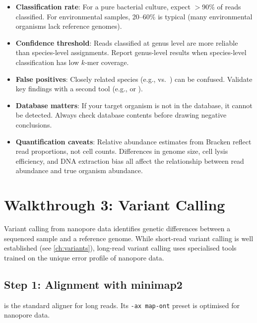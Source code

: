 \begin{itemize}[nosep]
  \item \textbf{Classification rate}: For a pure bacterial culture, expect $>$90\% of reads classified. For environmental samples, 20--60\% is typical (many environmental organisms lack reference genomes).
  \item \textbf{Confidence threshold}: Reads classified at genus level are more reliable than species-level assignments. Report genus-level results when species-level classification has low $k$-mer coverage.
  \item \textbf{False positives}: Closely related species (e.g.,  vs.\ ) can be confused. Validate key findings with a second tool (e.g.,  or ).
  \item \textbf{Database matters}: If your target organism is not in the database, it cannot be detected. Always check database contents before drawing negative conclusions.
  \item \textbf{Quantification caveats}: Relative abundance estimates from Bracken reflect read proportions, not cell counts. Differences in genome size, cell lysis efficiency, and DNA extraction bias all affect the relationship between read abundance and true organism abundance.
\end{itemize}

\section{Walkthrough 3: Variant Calling}
\label{sec:diyanalysis:variantcalling}

Variant calling from nanopore data identifies genetic differences between a sequenced sample and a reference genome. While short-read variant calling is well established (see \cref{ch:variants}), long-read variant calling uses specialised tools trained on the unique error profile of nanopore data.

\subsection{Step 1: Alignment with minimap2}
\label{subsec:diyanalysis:minimap2}

 is the standard aligner for long reads. Its \texttt{-ax map-ont} preset is optimised for nanopore data.

